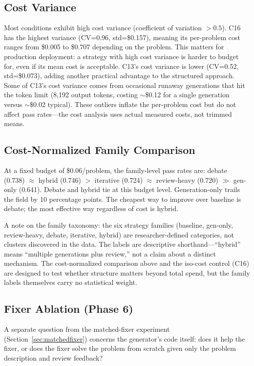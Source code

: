 \documentclass{article}
\begin{document}
\subsection{Cost Variance}

Most conditions exhibit high cost variance (coefficient of variation $>0.5$). C16 has the highest variance (CV=0.96, std=\$0.157), meaning its per-problem cost ranges from \$0.005 to \$0.707 depending on the problem. This matters for production deployment: a strategy with high cost variance is harder to budget for, even if its mean cost is acceptable. C13's cost variance is lower (CV=0.52, std=\$0.073), adding another practical advantage to the structured approach. Some of C13's cost variance comes from occasional runaway generations that hit the token limit (8,192 output tokens, costing ${\sim}$\$0.12 for a single generation versus ${\sim}$\$0.02 typical). These outliers inflate the per-problem cost but do not affect pass rates---the cost analysis uses actual measured costs, not trimmed means.

\subsection{Cost-Normalized Family Comparison}

At a fixed budget of \$0.06/problem, the family-level pass rates are: debate (0.738) $\approx$ hybrid (0.746) $>$ iterative (0.724) $\approx$ review-heavy (0.720) $\gg$ gen-only (0.641). Debate and hybrid tie at this budget level. Generation-only trails the field by 10 percentage points. The cheapest way to improve over baseline is debate; the most effective way regardless of cost is hybrid.

A note on the family taxonomy: the six strategy families (baseline, gen-only, review-heavy, debate, iterative, hybrid) are researcher-defined categories, not clusters discovered in the data. The labels are descriptive shorthand---``hybrid'' means ``multiple generations plus review,'' not a claim about a distinct mechanism. The cost-normalized comparison above and the iso-cost control (C16) are designed to test whether structure matters beyond total spend, but the family labels themselves carry no statistical weight.

\subsection{Fixer Ablation (Phase 6)}

A separate question from the matched-fixer experiment (Section~\ref{sec:matchedfixer}) concerns the generator's code itself: does it help the fixer, or does the fixer solve the problem from scratch given only the problem description and review feedback?
\end{document}
